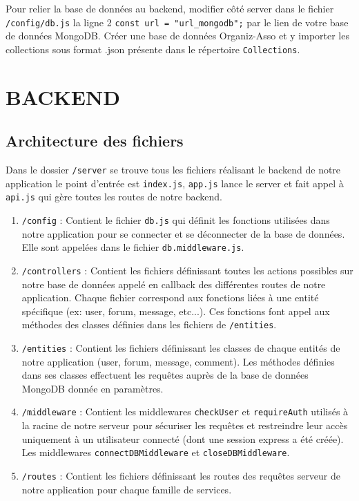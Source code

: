 \documentclass{article}
\begin{document}
Pour relier la base de données au backend, modifier côté server dans le fichier \texttt{/config/db.js} la ligne 2 \texttt{const url = "url\_mongodb";} par le lien de votre base de données MongoDB. Créer une base de données Organiz-Asso et y importer les collections sous format .json présente dans le répertoire \texttt{Collections}.

\section{BACKEND}

\subsection*{Architecture des fichiers}
Dans le dossier \texttt{/server} se trouve tous les fichiers réalisant le backend de notre application le point d'entrée est \texttt{index.js}, \texttt{app.js} lance le server et fait appel à \texttt{api.js} qui gère toutes les routes de notre backend.

\begin{enumerate}
    \item \texttt{/config} : Contient le fichier \texttt{db.js} qui définit les fonctions utilisées dans notre application pour se connecter et se déconnecter de la base de données. Elle sont appelées dans le fichier \texttt{db.middleware.js}.
    \item \texttt{/controllers} : Contient les fichiers définissant toutes les actions possibles sur notre base de données appelé en callback des différentes routes de notre application. Chaque fichier correspond aux fonctions liées à une entité spécifique (ex: user, forum, message, etc...). Ces fonctions font appel aux méthodes des classes définies dans les fichiers de \texttt{/entities}.
    \item \texttt{/entities} : Contient les fichiers définissant les classes de chaque entités de notre application (user, forum, message, comment). Les méthodes définies dans ses classes effectuent les requêtes auprès de la base de données MongoDB donnée en paramètres.
    \item \texttt{/middleware} : Contient les middlewares \texttt{checkUser} et \texttt{requireAuth} utilisés à la racine de notre serveur pour sécuriser les requêtes et restreindre leur accès uniquement à un utilisateur connecté (dont une session express a été créée). Les middlewares \texttt{connectDBMiddleware} et \texttt{closeDBMiddleware}.
    \item \texttt{/routes} : Contient les fichiers définissant les routes des requêtes serveur de notre application pour chaque famille de services.
\end{enumerate}
\end{document}
